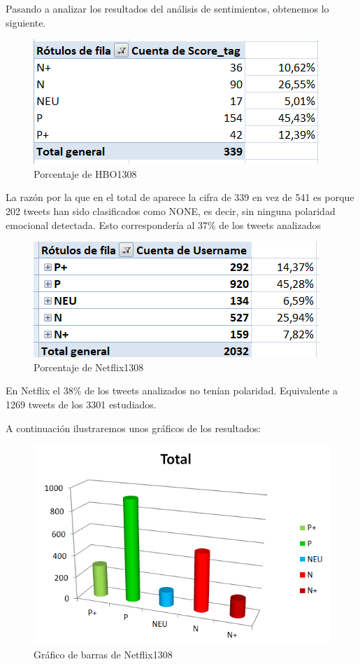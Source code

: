 Pasando a analizar los resultados del análisis de sentimientos, obtenemos lo siguiente. 

\begin{figure}[H]
	\centering
	\includegraphics[scale=1]{imagenes/porcentaje-HBO1308.PNG}
	\caption{Porcentaje de HBO1308}
	\label{fig:porcentaje-HBO1308}
\end{figure}

La razón por la que en el total de aparece la cifra de 339 en vez de 541 es porque 202 tweets han sido clasificados como NONE, es decir, sin ninguna polaridad emocional detectada. Esto correspondería al 37\% de los tweets analizados

\begin{figure}[H]
	\centering
	\includegraphics[scale=1]{imagenes/PorcentajesNetflix1308.PNG}
	\caption{Porcentaje de Netflix1308}
	\label{fig:porcentaje-Netflix1308}
\end{figure}


En Netflix el 38\% de los tweets analizados no tenían polaridad. Equivalente a 1269 tweets de los 3301 estudiados. 

A continuación ilustraremos unos gráficos de los resultados: 

\begin{figure}[H]
	\centering
	\includegraphics[scale=1]{imagenes/GraficoBarrasNetflix1308.PNG}
	\caption{Gráfico de barras de Netflix1308}
	\label{fig:barrasNetflix1308}
\end{figure}


